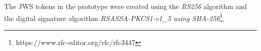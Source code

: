 The JWS tokens in the prototype were created using the \emph{RS256} algorithm and the digital signature algorithm \emph{RSASSA-PKCS1-v1\_5 using SHA-256}\footnote{https://www.rfc-editor.org/rfc/rfc3447}. 


  
  



